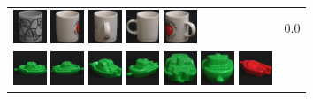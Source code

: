 \begin{figure}[tbp]
\begin{center}
\begin{tabular}{m{11cm} | m{3cm} |}
\includegraphics[width=1cm]{coil/beeld-52.eps}
\includegraphics[width=1cm]{coil/beeld-38.eps}
\includegraphics[width=1cm]{coil/beeld-41.eps}
\includegraphics[width=1cm]{coil/beeld-37.eps}
\includegraphics[width=1cm]{coil/beeld-40.eps}
& {\scriptsize 0.0}
\\
\includegraphics[width=1cm]{coil/beeld-54.eps}
\includegraphics[width=1cm]{coil/beeld-55.eps}
\includegraphics[width=1cm]{coil/beeld-58.eps}
\includegraphics[width=1cm]{coil/beeld-57.eps}
\includegraphics[width=1cm]{coil/beeld-59.eps}
\includegraphics[width=1cm]{coil/beeld-56.eps}
\includegraphics[width=1cm]{coil/beeld-22.eps}

\end{tabular}
\end{center}
\end{figure}

